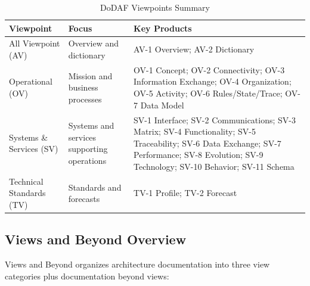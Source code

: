 \documentclass[11pt]{article}
\begin{document}
\begin{longtable}{@{}L{2.5cm} L{4cm} L{6cm}@{}}
\caption{DoDAF Viewpoints Summary} \\
\toprule
\textbf{Viewpoint} & \textbf{Focus} & \textbf{Key Products} \\
\midrule
\endfirsthead
\bottomrule
\endlastfoot
All Viewpoint (AV) & Overview and dictionary & AV-1 Overview; AV-2 Dictionary \\
Operational (OV) & Mission and business processes & OV-1 Concept; OV-2 Connectivity; OV-3 Information Exchange; OV-4 Organization; OV-5 Activity; OV-6 Rules/State/Trace; OV-7 Data Model \\
Systems \& Services (SV) & Systems and services supporting operations & SV-1 Interface; SV-2 Communications; SV-3 Matrix; SV-4 Functionality; SV-5 Traceability; SV-6 Data Exchange; SV-7 Performance; SV-8 Evolution; SV-9 Technology; SV-10 Behavior; SV-11 Schema \\
Technical Standards (TV) & Standards and forecasts & TV-1 Profile; TV-2 Forecast \\
\end{longtable}

\subsection{Views and Beyond Overview}

Views and Beyond organizes architecture documentation into three view categories plus documentation beyond views:
\end{document}
